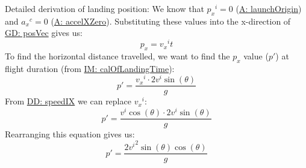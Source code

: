 \documentclass[12pt]{article}
\begin{document}
Detailed derivation of landing position:
We know that ${{p_{x}}^{i}}=0$ (\hyperref[launchOrigin]{A: launchOrigin}) and ${{a_{x}}^{c}}=0$ (\hyperref[accelXZero]{A: accelXZero}). Substituting these values into the x-direction of \hyperref[GD:posVec]{GD: posVec} gives us:
\begin{displaymath}
{p_{x}}={{v_{x}}^{i}} t
\end{displaymath}
To find the horizontal distance travelled, we want to find the ${p_{x}}$ value ($p'$) at flight duration (from \hyperref[IM:calOfLandingTime]{IM: calOfLandingTime}):
\begin{displaymath}
p'=\frac{{{v_{x}}^{i}}\cdot{}2 {v^{i}} \sin\left(θ\right)}{g}
\end{displaymath}
From \hyperref[DD:speedIX]{DD: speedIX} we can replace ${{v_{x}}^{i}}$:
\begin{displaymath}
p'=\frac{{v^{i}} \cos\left(θ\right)\cdot{}2 {v^{i}} \sin\left(θ\right)}{g}
\end{displaymath}
Rearranging this equation gives us:
\begin{displaymath}
p'=\frac{2 {v^{i}}^{2} \sin\left(θ\right) \cos\left(θ\right)}{g}
\end{displaymath}
\par~
\end{document}
